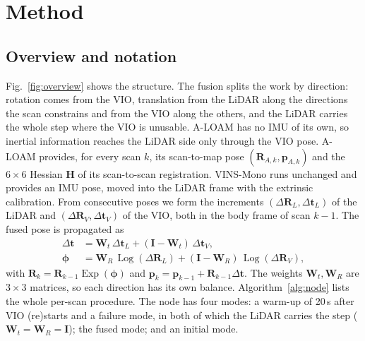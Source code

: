 \documentclass[journal]{IEEEtran}
\newcommand{\Exp}{\operatorname{Exp}}
\newcommand{\Log}{\operatorname{Log}}
\begin{document}
\section{Method}
\subsection{Overview and notation}
Fig.~\ref{fig:overview} shows the structure. The fusion splits the work by direction: rotation comes from the VIO, translation from the LiDAR along the directions the scan constrains and from the VIO along the others, and the LiDAR carries the whole step where the VIO is unusable. A-LOAM \cite{aloam} has no IMU of its own, so inertial information reaches the LiDAR side only through the VIO pose. A-LOAM provides, for every scan $k$, its scan-to-map pose $(\mathbf R_{A,k},\mathbf p_{A,k})$ and the $6\times6$ Hessian $\mathbf H$ of its scan-to-scan registration. VINS-Mono \cite{vinsmono2018} runs unchanged and provides an IMU pose, moved into the LiDAR frame with the extrinsic calibration. From consecutive poses we form the increments $(\Delta\mathbf R_L,\Delta\mathbf t_L)$ of the LiDAR and $(\Delta\mathbf R_V,\Delta\mathbf t_V)$ of the VIO, both in the body frame of scan $k-1$. The fused pose is propagated as
\begin{align}
\Delta\mathbf t &= \mathbf W_t\,\Delta\mathbf t_L + (\mathbf I-\mathbf W_t)\,\Delta\mathbf t_V, \label{eq:t}\\
\boldsymbol\phi &= \mathbf W_R\,\Log(\Delta\mathbf R_L) + (\mathbf I-\mathbf W_R)\,\Log(\Delta\mathbf R_V), \label{eq:r}
\end{align}
with $\mathbf R_k=\mathbf R_{k-1}\Exp(\boldsymbol\phi)$ and $\mathbf p_k=\mathbf p_{k-1}+\mathbf R_{k-1}\Delta\mathbf t$. The weights $\mathbf W_t,\mathbf W_R$ are $3\times3$ matrices, so each direction has its own balance. Algorithm~\ref{alg:node} lists the whole per-scan procedure. The node has four modes: a warm-up of 20\,s after VIO (re)starts and a failure mode, in both of which the LiDAR carries the step ($\mathbf W_t=\mathbf W_R=\mathbf I$); the fused mode; and an initial mode.
\end{document}
